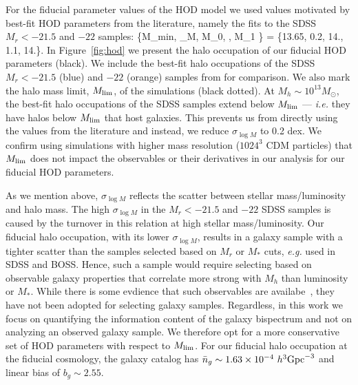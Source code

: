 For the fiducial parameter values of the HOD model we used values motivated by 
best-fit HOD parameters from the literature, namely the \cite{zheng2007} 
fits to the SDSS $M_r < -21.5$  and $-22$ samples: 
\beq \label{eq:hod_fid}
\{M_{\rm min}, \sigma_{\log M}, \log M_0, \alpha, \log M_1 \} = \{13.65, 0.2, 14., 1.1, 14.\}.
\eeq
In Figure~\ref{fig:hod} we present the halo occupation of our fiducial 
HOD parameters (black). We include the best-fit halo occupations of 
the SDSS $M_r < -21.5$ (blue)  and $-22$ (orange) samples from \cite{zheng2007}
for comparison. We also mark the halo mass limit, $M_{\rm lim}$, of the \quij 
simulations (black dotted). At $M_h \sim 10^{13} M_\odot$, the best-fit halo 
occupations of the SDSS samples extend below $M_{\rm lim}$ --- \emph{i.e.} 
they have halos below $M_{\rm lim}$ that host galaxies. This prevents us from 
directly using the values from the literature and instead, we reduce 
$\sigma_{\log M}$ to 0.2 dex. We confirm using \quij simulations with higher 
mass resolution ($1024^3$ CDM particles) that $M_{\rm lim}$ does not impact
the observables or their derivatives in our analysis for our fiducial HOD 
parameters. 

As we mention above, $\sigma_{\log M}$ reflects the scatter between stellar 
mass/luminosity and halo mass. The high $\sigma_{\log M}$ in the $M_r < -21.5$ 
and $-22$ SDSS samples is caused by the turnover in this relation at high stellar 
mass/luminosity. Our fiducial halo occupation, with its lower $\sigma_{\log M}$, 
results in a galaxy sample with a tighter scatter than the samples selected based 
on $M_r$ or $M_*$ cuts, \emph{e.g.} used in SDSS and BOSS. Hence, such a sample
would require selecting based on observable galaxy properties that correlate 
more strong with $M_h$ than luminosity or $M_*$. While there is some evdience
that such observables are availabe~\citep[\eg $L_{\rm sat}$; ][]{alpaslan2019},
they have not been adopted for selecting galaxy samples. Regardless, in this work
we focus on quantifying the information content of the galaxy bispectrum 
and not on analyzing an observed galaxy sample. We therefore opt for a more 
conservative set of HOD parameters with respect to $M_{\rm lim}$. For our
fiducial halo occupation at the fiducial cosmology, the galaxy catalog has 
$\bar{n}_g \sim 1.63\times 10^{-4}~h^3{\rm Gpc}^{-3}$ and linear bias of 
$b_g \sim 2.55$.

